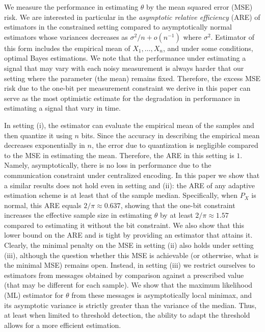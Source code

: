 \documentclass[letterpaper, conference, 11pt]{IEEEtran}      %
\begin{document}
We measure the performance in estimating $\theta$ by the mean squared error (MSE) risk. We are interested in particular in the \emph{asymptotic relative efficiency} (ARE) of estimators in the constrained setting compared to asymptotically normal estimators whose variances decreases as $\sigma^2/n+o(n^{-1})$ where $\sigma^2$. Estimator of this form includes the empirical mean of $X_1,\ldots,X_n$, and under some conditions, optimal Bayes estimations. We note that the performance under estimating a signal that may vary with each noisy measurement is always harder that our setting where the parameter (the mean) remains fixed. Therefore, the excess MSE risk due to the one-bit per measurement constraint we derive in this paper can serve as the most optimistic estimate for the degradation in performance in estimating a signal that vary in time. 


In setting (i), the estimator can evaluate the empirical mean of the samples and then quantize it using $n$ bits. Since the accuracy in describing the empirical mean decreases exponentially in $n$, the error due to quantization is negligible compared to the MSE in estimating the mean. Therefore, the ARE in this setting is $1$. Namely, asymptotically, there is no loss in performance due to the communication constraint under centralized encoding. 
%
In this paper we show that a similar results does not hold even in setting and (ii): the ARE of any adaptive estimation scheme is at least that of the sample median. Specifically, when $P_X$ is normal, this ARE equals $2/\pi \approx 0.637$, showing that the one-bit constraint increases the effective sample size in estimating $\theta$ by at least $2/\pi \approx 1.57$ compared to estimating it without the bit constraint. We also show that this lower bound on the ARE and is tight by providing an estimator that attains it. %
%
Clearly, the minimal penalty on the MSE in setting (ii) also holds under setting (iii), although the question whether this MSE is achievable (or otherwise, what is the minimal MSE) remains open. Instead, in setting (iii) we restrict ourselves to estimators from messages obtained by comparison against a prescribed value (that may be different for each sample). We show that the maximum likelihood (ML) estimator for $\theta$ from these messages is asymptotically local minimax, and its asymptotic variance is strictly greater than the variance of the median. Thus, at least when limited to threshold detection, the ability to adapt the threshold allows for a more efficient estimation. %
\end{document}
